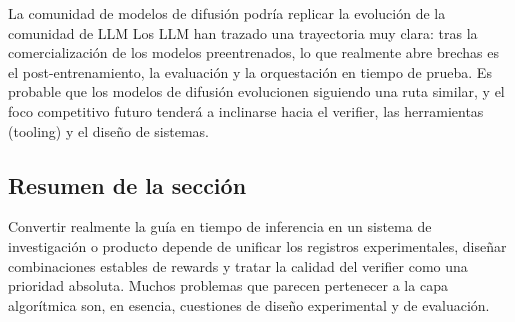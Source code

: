 \begin{knowledgebox}{La comunidad de modelos de difusión podría replicar la evolución de la comunidad de LLM}
Los LLM han trazado una trayectoria muy clara: tras la comercialización de los modelos preentrenados, lo que realmente abre brechas es el post-entrenamiento, la evaluación y la orquestación en tiempo de prueba. Es probable que los modelos de difusión evolucionen siguiendo una ruta similar, y el foco competitivo futuro tenderá a inclinarse hacia el verifier, las herramientas (tooling) y el diseño de sistemas.
\end{knowledgebox}

\subsection{Resumen de la sección}

Convertir realmente la guía en tiempo de inferencia en un sistema de investigación o producto depende de unificar los registros experimentales, diseñar combinaciones estables de rewards y tratar la calidad del verifier como una prioridad absoluta. Muchos problemas que parecen pertenecer a la capa algorítmica son, en esencia, cuestiones de diseño experimental y de evaluación.
